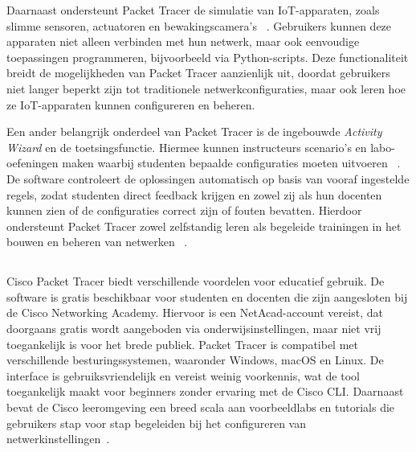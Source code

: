 \vspace{0.3cm}

Daarnaast ondersteunt Packet Tracer de simulatie van IoT-apparaten, zoals slimme sensoren, actuatoren en bewakingscamera’s ~\autocite{thera2020}. Gebruikers kunnen deze apparaten niet alleen verbinden met hun netwerk, maar ook eenvoudige toepassingen programmeren, bijvoorbeeld via Python-scripts. Deze functionaliteit breidt de mogelijkheden van Packet Tracer aanzienlijk uit, doordat gebruikers niet langer beperkt zijn tot traditionele netwerkconfiguraties, maar ook leren hoe ze IoT-apparaten kunnen configureren en beheren.

\vspace{0.3cm}

Een ander belangrijk onderdeel van Packet Tracer is de ingebouwde \textit{Activity Wizard} en de toetsingsfunctie. Hiermee kunnen instructeurs scenario’s en labo-oefeningen maken waarbij studenten bepaalde configuraties moeten uitvoeren ~\autocite{asee_peer_2016}. De software controleert de oplossingen automatisch op basis van vooraf ingestelde regels, zodat studenten direct feedback krijgen en zowel zij als hun docenten kunnen zien of de configuraties correct zijn of fouten bevatten. Hierdoor ondersteunt Packet Tracer zowel zelfstandig leren als begeleide trainingen in het bouwen en beheren van netwerken ~\autocite{asee_peer_2016}.


\subsection{}
\label{sec:Voordelen in het onderwijs}
Cisco Packet Tracer biedt verschillende voordelen voor educatief gebruik. De software is gratis beschikbaar voor studenten en docenten die zijn aangesloten bij de Cisco Networking Academy. Hiervoor is een NetAcad-account vereist, dat doorgaans gratis wordt aangeboden via onderwijsinstellingen, maar niet vrij toegankelijk is voor het brede publiek. Packet Tracer is compatibel met verschillende besturingssystemen, waaronder Windows, macOS en Linux. De interface is gebruiksvriendelijk en vereist weinig voorkennis, wat de tool toegankelijk maakt voor beginners zonder ervaring met de Cisco CLI. Daarnaast bevat de Cisco leeromgeving een breed scala aan voorbeeldlabs en tutorials die gebruikers stap voor stap begeleiden bij het configureren van netwerkinstellingen~\autocite{packetTracerResources2025}.

\vspace{0.3cm}

